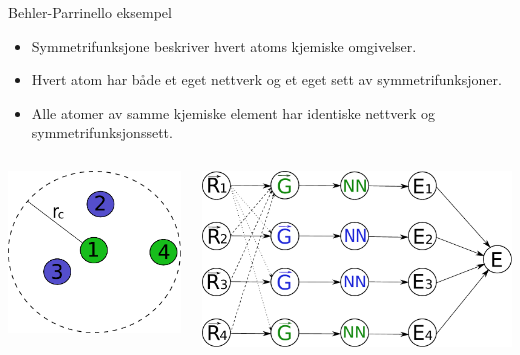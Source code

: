 \documentclass{beamer}
\begin{document}
\begin{frame}{Behler-Parrinello eksempel}

\begin{itemize}
 \item Symmetrifunksjone beskriver hvert atoms kjemiske omgivelser. 
 \item Hvert atom har både et eget nettverk og et eget sett av symmetrifunksjoner.  
 \item Alle atomer av samme kjemiske element har identiske nettverk og symmetrifunksjonssett. 
\end{itemize}

\begin{columns}[c] %
  \begin{column}[c]{0.35\linewidth} %
   \centering
   \includegraphics[width=\linewidth]{../Figures/Presentation/cutoffSphere.pdf}
  \end{column}
  \begin{column}[c]{0.65\linewidth} %
   \includegraphics[width=\linewidth]{../Figures/Presentation/BehlerParrinello.pdf}
  \end{column}
\end{columns}

\end{frame}
\end{document}
